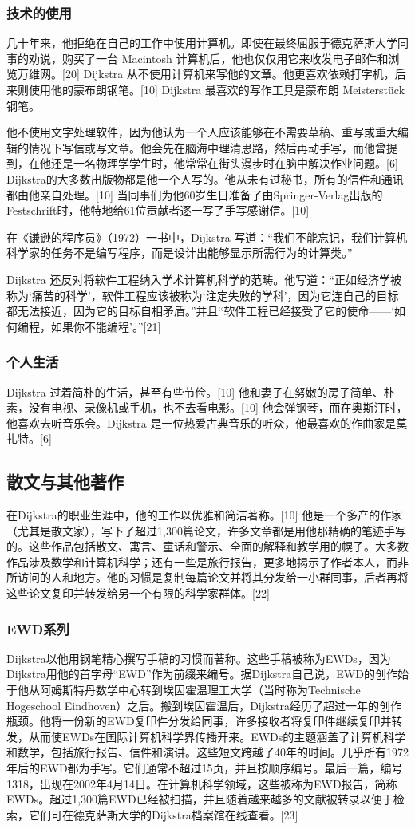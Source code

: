 \subsubsection{技术的使用}
几十年来，他拒绝在自己的工作中使用计算机。即使在最终屈服于德克萨斯大学同事的劝说，购买了一台 Macintosh 计算机后，他也仅仅用它来收发电子邮件和浏览万维网。[20] Dijkstra 从不使用计算机来写他的文章。他更喜欢依赖打字机，后来则使用他的蒙布朗钢笔。[10] Dijkstra 最喜欢的写作工具是蒙布朗 Meisterstück 钢笔。

他不使用文字处理软件，因为他认为一个人应该能够在不需要草稿、重写或重大编辑的情况下写信或写文章。他会先在脑海中理清思路，然后再动手写，而他曾提到，在他还是一名物理学学生时，他常常在街头漫步时在脑中解决作业问题。[6] Dijkstra的大多数出版物都是他一个人写的。他从未有过秘书，所有的信件和通讯都由他亲自处理。[10] 当同事们为他60岁生日准备了由Springer-Verlag出版的Festschrift时，他特地给61位贡献者逐一写了手写感谢信。[10]

在《谦逊的程序员》（1972）一书中，Dijkstra 写道：“我们不能忘记，我们计算机科学家的任务不是编写程序，而是设计出能够显示所需行为的计算类。”

Dijkstra 还反对将软件工程纳入学术计算机科学的范畴。他写道：“正如经济学被称为‘痛苦的科学’，软件工程应该被称为‘注定失败的学科’，因为它连自己的目标都无法接近，因为它的目标自相矛盾。”并且“软件工程已经接受了它的使命——‘如何编程，如果你不能编程’。”[21]
\subsubsection{个人生活}
Dijkstra 过着简朴的生活，甚至有些节俭。[10] 他和妻子在努嫩的房子简单、朴素，没有电视、录像机或手机，也不去看电影。[10] 他会弹钢琴，而在奥斯汀时，他喜欢去听音乐会。Dijkstra 是一位热爱古典音乐的听众，他最喜欢的作曲家是莫扎特。[6]
\subsection{散文与其他著作}
在Dijkstra的职业生涯中，他的工作以优雅和简洁著称。[10] 他是一个多产的作家（尤其是散文家），写下了超过1,300篇论文，许多文章都是用他那精确的笔迹手写的。这些作品包括散文、寓言、童话和警示、全面的解释和教学用的幌子。大多数作品涉及数学和计算机科学；还有一些是旅行报告，更多地揭示了作者本人，而非所访问的人和地方。他的习惯是复制每篇论文并将其分发给一小群同事，后者再将这些论文复印并转发给另一个有限的科学家群体。[22]
\subsubsection{EWD系列}
Dijkstra以他用钢笔精心撰写手稿的习惯而著称。这些手稿被称为EWDs，因为Dijkstra用他的首字母“EWD”作为前缀来编号。据Dijkstra自己说，EWD的创作始于他从阿姆斯特丹数学中心转到埃因霍温理工大学（当时称为Technische Hogeschool Eindhoven）之后。搬到埃因霍温后，Dijkstra经历了超过一年的创作瓶颈。他将一份新的EWD复印件分发给同事，许多接收者将复印件继续复印并转发，从而使EWDs在国际计算机科学界传播开来。EWDs的主题涵盖了计算机科学和数学，包括旅行报告、信件和演讲。这些短文跨越了40年的时间。几乎所有1972年后的EWD都为手写。它们通常不超过15页，并且按顺序编号。最后一篇，编号1318，出现在2002年4月14日。在计算机科学领域，这些被称为EWD报告，简称EWDs。超过1,300篇EWD已经被扫描，并且随着越来越多的文献被转录以便于检索，它们可在德克萨斯大学的Dijkstra档案馆在线查看。[23]
